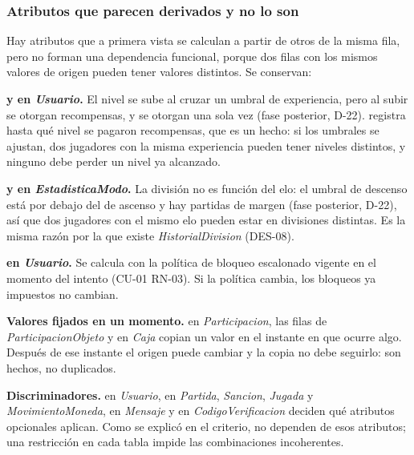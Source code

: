 \subsubsection*{Atributos que parecen derivados y no lo son}

Hay atributos que a primera vista se calculan a partir de otros de la misma fila, pero no forman una dependencia funcional, porque dos filas con los mismos valores de origen pueden tener valores distintos. Se conservan:

\begin{reglas}
  \item \textbf{ y  en \textit{Usuario}.} El nivel se sube al cruzar un umbral de experiencia, pero al subir se otorgan recompensas, y se otorgan una sola vez (fase posterior, \mbox{D-22}).  registra hasta qué nivel se pagaron recompensas, que es un hecho: si los umbrales se ajustan, dos jugadores con la misma experiencia pueden tener niveles distintos, y ninguno debe perder un nivel ya alcanzado.
  \item \textbf{ y  en \textit{EstadisticaModo}.} La división no es función del elo: el umbral de descenso está por debajo del de ascenso y hay partidas de margen (fase posterior, \mbox{D-22}), así que dos jugadores con el mismo elo pueden estar en divisiones distintas. Es la misma razón por la que existe \textit{HistorialDivision} (\mbox{DES-08}).
  \item \textbf{ en \textit{Usuario}.} Se calcula con la política de bloqueo escalonado vigente en el momento del intento (\mbox{CU-01} \mbox{RN-03}). Si la política cambia, los bloqueos ya impuestos no cambian.
  \item \textbf{Valores fijados en un momento.}  en \textit{Participacion}, las filas de \textit{ParticipacionObjeto} y  en \textit{Caja} copian un valor en el instante en que ocurre algo. Después de ese instante el origen puede cambiar y la copia no debe seguirlo: son hechos, no duplicados.
  \item \textbf{Discriminadores.}  en \textit{Usuario},  en \textit{Partida}, \textit{Sancion}, \textit{Jugada} y \textit{MovimientoMoneda},  en \textit{Mensaje} y  en \textit{CodigoVerificacion} deciden qué atributos opcionales aplican. Como se explicó en el criterio, no dependen de esos atributos; una restricción  en cada tabla impide las combinaciones incoherentes.
\end{reglas}
